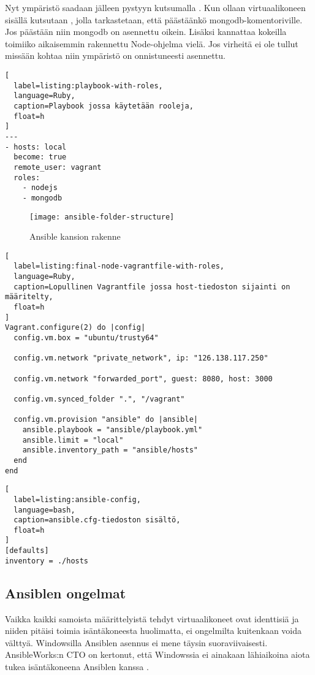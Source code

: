 Nyt ympäristö saadaan jälleen pystyyn kutsumalla . Kun ollaan virtuaalikoneen sisällä kutsutaan , jolla tarkastetaan, että päästäänkö mongodb-komentoriville. Jos päästään niin mongodb on asennettu oikein. Lisäksi kannattaa kokeilla toimiiko aikaisemmin rakennettu Node-ohjelma vielä. Jos virheitä ei ole tullut missään kohtaa niin ympäristö on onnistuneesti asennettu.

\begin{lstlisting}[
  label=listing:playbook-with-roles,
  language=Ruby,
  caption=Playbook jossa käytetään rooleja,
  float=h
]
---
- hosts: local
  become: true
  remote_user: vagrant
  roles:
    - nodejs
    - mongodb
\end{lstlisting}

\begin{figure}[h]
  \texttt{[image: ansible-folder-structure]}
  \caption{Ansible kansion rakenne}
  \label{fig:ansible-folder-structure}
\end{figure}

\begin{lstlisting}[
  label=listing:final-node-vagrantfile-with-roles,
  language=Ruby,
  caption=Lopullinen Vagrantfile jossa host-tiedoston sijainti on määritelty,
  float=h
]
Vagrant.configure(2) do |config|
  config.vm.box = "ubuntu/trusty64"

  config.vm.network "private_network", ip: "126.138.117.250"

  config.vm.network "forwarded_port", guest: 8080, host: 3000

  config.vm.synced_folder ".", "/vagrant"

  config.vm.provision "ansible" do |ansible|
    ansible.playbook = "ansible/playbook.yml"
    ansible.limit = "local"
    ansible.inventory_path = "ansible/hosts"
  end
end
\end{lstlisting}

\begin{lstlisting}[
  label=listing:ansible-config,
  language=bash,
  caption=ansible.cfg-tiedoston sisältö,
  float=h
]
[defaults]
inventory = ./hosts
\end{lstlisting}

\subsection{Ansiblen ongelmat}

Vaikka kaikki samoista määrittelyistä tehdyt virtuaalikoneet ovat identtisiä ja niiden pitäisi toimia isäntäkoneesta huolimatta, ei ongelmilta kuitenkaan voida välttyä. Windowsilla Ansiblen asennus ei mene täysin suoraviivaisesti. AnsibleWorks:n CTO on kertonut, että Windowssia ei ainakaan lähiaikoina aiota tukea isäntäkoneena Ansiblen kanssa \cite{link:windows-support-for-ansible}.

